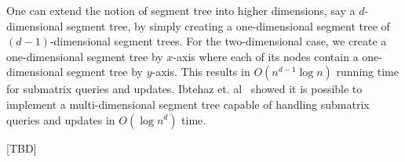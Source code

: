 One can extend the notion of segment tree into higher dimensions, say a $d$-dimensional segment tree, by simply creating a one-dimensional segment tree of $(d-1)$-dimensional segment trees.  For the two-dimensional case, we create a one-dimensional segment tree by $x$-axis where each of its nodes contain a one-dimensional segment tree by $y$-axis. This results in $O(n^{d-1}\log{n})$ running time for submatrix queries and updates. Ibtehaz et. al~\cite{ibtehaz2018multidimensional} showed it is possible to implement a multi-dimensional segment tree capable of handling submatrix queries and updates in $O(\log{n}^d)$ time. 

[TBD]
